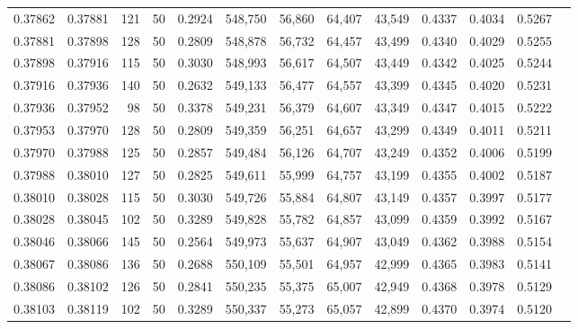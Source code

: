 \begin{tabular}{rrrrrrrrrrrrr}
0.37862 & 0.37881 &   121 &  50 &                                     0.2924 & 548,750 &  56,860 &  64,407 &  43,549 & 0.4337 & 0.4034 & 0.5267 \\
0.37881 & 0.37898 &   128 &  50 &                                     0.2809 & 548,878 &  56,732 &  64,457 &  43,499 & 0.4340 & 0.4029 & 0.5255 \\
0.37898 & 0.37916 &   115 &  50 &                                     0.3030 & 548,993 &  56,617 &  64,507 &  43,449 & 0.4342 & 0.4025 & 0.5244 \\
0.37916 & 0.37936 &   140 &  50 &                                     0.2632 & 549,133 &  56,477 &  64,557 &  43,399 & 0.4345 & 0.4020 & 0.5231 \\
0.37936 & 0.37952 &    98 &  50 &                                     0.3378 & 549,231 &  56,379 &  64,607 &  43,349 & 0.4347 & 0.4015 & 0.5222 \\
0.37953 & 0.37970 &   128 &  50 &                                     0.2809 & 549,359 &  56,251 &  64,657 &  43,299 & 0.4349 & 0.4011 & 0.5211 \\
0.37970 & 0.37988 &   125 &  50 &                                     0.2857 & 549,484 &  56,126 &  64,707 &  43,249 & 0.4352 & 0.4006 & 0.5199 \\
0.37988 & 0.38010 &   127 &  50 &                                     0.2825 & 549,611 &  55,999 &  64,757 &  43,199 & 0.4355 & 0.4002 & 0.5187 \\
0.38010 & 0.38028 &   115 &  50 &                                     0.3030 & 549,726 &  55,884 &  64,807 &  43,149 & 0.4357 & 0.3997 & 0.5177 \\
0.38028 & 0.38045 &   102 &  50 &                                     0.3289 & 549,828 &  55,782 &  64,857 &  43,099 & 0.4359 & 0.3992 & 0.5167 \\
0.38046 & 0.38066 &   145 &  50 &                                     0.2564 & 549,973 &  55,637 &  64,907 &  43,049 & 0.4362 & 0.3988 & 0.5154 \\
0.38067 & 0.38086 &   136 &  50 &                                     0.2688 & 550,109 &  55,501 &  64,957 &  42,999 & 0.4365 & 0.3983 & 0.5141 \\
0.38086 & 0.38102 &   126 &  50 &                                     0.2841 & 550,235 &  55,375 &  65,007 &  42,949 & 0.4368 & 0.3978 & 0.5129 \\
0.38103 & 0.38119 &   102 &  50 &                                     0.3289 & 550,337 &  55,273 &  65,057 &  42,899 & 0.4370 & 0.3974 & 0.5120 \\

\end{tabular}
